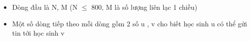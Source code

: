 \begin{itemize}
	\item Dòng đầu là N, M (N  $\le$  800, M là số lượng liên lạc 1 chiều)
	\item Một số dòng tiếp theo mỗi dòng gồm 2 số u , v cho biết học sinh u có thể gửi tin tới học sinh v
\end{itemize}

\
